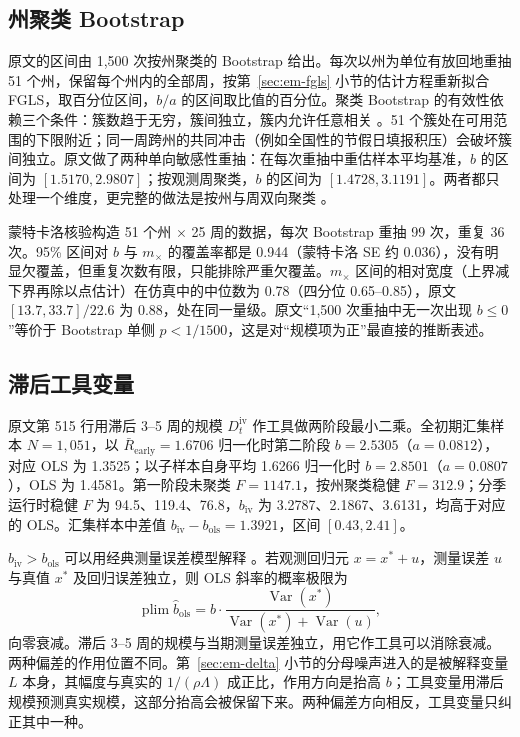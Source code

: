 \subsection{州聚类 Bootstrap}

原文的区间由 1,500 次按州聚类的 Bootstrap 给出。每次以州为单位有放回地重抽 51 个州，保留每个州内的全部周，按第~\ref{sec:em-fgls} 小节的估计方程重新拟合 FGLS，取百分位区间，$b/a$ 的区间取比值的百分位。聚类 Bootstrap 的有效性依赖三个条件：簇数趋于无穷，簇间独立，簇内允许任意相关 \citep{cameron2008bootstrap,cameron2015practitioner}。51 个簇处在可用范围的下限附近；同一周跨州的共同冲击（例如全国性的节假日填报积压）会破坏簇间独立。原文做了两种单向敏感性重抽：在每次重抽中重估样本平均基准，$b$ 的区间为 $[1.5170, 2.9807]$；按观测周聚类，$b$ 的区间为 $[1.4728, 3.1191]$。两者都只处理一个维度，更完整的做法是按州与周双向聚类 \citep{cameron2011robust}。

蒙特卡洛核验构造 51 个州 $\times$ 25 周的数据，每次 Bootstrap 重抽 99 次，重复 36 次。95\% 区间对 $b$ 与 $m_\times$ 的覆盖率都是 0.944（蒙特卡洛 SE 约 0.036），没有明显欠覆盖，但重复次数有限，只能排除严重欠覆盖。$m_\times$ 区间的相对宽度（上界减下界再除以点估计）在仿真中的中位数为 0.78（四分位 0.65--0.85），原文 $[13.7, 33.7]/22.6$ 为 0.88，处在同一量级。原文“1,500 次重抽中无一次出现 $b\le0$”等价于 Bootstrap 单侧 $p<1/1500$，这是对“规模项为正”最直接的推断表述。

\subsection{滞后工具变量}

原文第 515 行用滞后 3--5 周的规模 $D_t^{\mathrm{iv}}$ 作工具做两阶段最小二乘。全初期汇集样本 $N=1{,}051$，以 $\bar R_{\mathrm{early}}=1.6706$ 归一化时第二阶段 $b=2.5305$（$a=0.0812$），对应 OLS 为 1.3525；以子样本自身平均 1.6266 归一化时 $b=2.8501$（$a=0.0807$），OLS 为 1.4581。第一阶段未聚类 $F=1147.1$，按州聚类稳健 $F=312.9$；分季运行时稳健 $F$ 为 94.5、119.4、76.8，$b_{\mathrm{iv}}$ 为 3.2787、2.1867、3.6131，均高于对应的 OLS。汇集样本中差值 $b_{\mathrm{iv}}-b_{\mathrm{ols}}=1.3921$，区间 $[0.43, 2.41]$。

$b_{\mathrm{iv}}>b_{\mathrm{ols}}$ 可以用经典测量误差模型解释 \citep{fuller1987measurement,carroll2006measurement}。若观测回归元 $x=x^*+u$，测量误差 $u$ 与真值 $x^*$ 及回归误差独立，则 OLS 斜率的概率极限为
\begin{equation*}
\operatorname{plim}\hat b_{\mathrm{ols}}=b\cdot\frac{\operatorname{Var}(x^*)}{\operatorname{Var}(x^*)+\operatorname{Var}(u)},
\end{equation*}
向零衰减。滞后 3--5 周的规模与当期测量误差独立，用它作工具可以消除衰减。两种偏差的作用位置不同。第~\ref{sec:em-delta} 小节的分母噪声进入的是被解释变量 $L$ 本身，其幅度与真实的 $1/(\rho\Lambda)$ 成正比，作用方向是抬高 $b$；工具变量用滞后规模预测真实规模，这部分抬高会被保留下来。两种偏差方向相反，工具变量只纠正其中一种。

